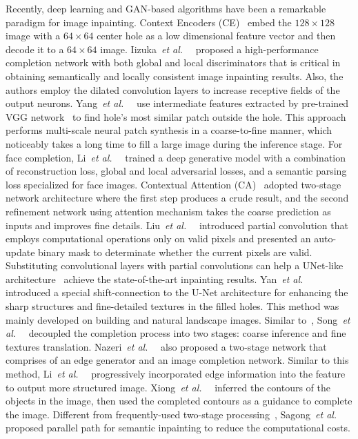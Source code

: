 \documentclass[journal]{IEEEtran}
\newcommand{\etal}{\emph{et al.}~}
\begin{document}
Recently, deep learning and GAN-based algorithms have been a remarkable paradigm for image inpainting. Context Encoders (CE)~\cite{CE} embed the $128 \times 128$ image with a $64 \times 64$ center hole as a low dimensional feature vector and then decode it to a $64 \times 64$ image. Iizuka~\etal~\cite{globally-and-locally} proposed a high-performance completion network with both global and local discriminators that is critical in obtaining semantically and locally consistent image inpainting results. Also, the authors employ the dilated convolution layers to increase receptive fields of the output neurons. Yang~\etal~\cite{high-resolution-multi-scale} use intermediate features extracted by pre-trained VGG network~\cite{VGG19} to find hole's most similar patch outside the hole. This approach performs multi-scale neural patch synthesis in a coarse-to-fine manner, which noticeably takes a long time to fill a large image during the inference stage. For face completion, Li~\etal~\cite{GFC} trained a deep generative model with a combination of reconstruction loss, global and local adversarial losses, and a semantic parsing loss specialized for face images. Contextual Attention (CA)~\cite{contextual-attention} adopted two-stage network architecture where the first step produces a crude result, and the second refinement network using attention mechanism takes the coarse prediction as inputs and improves fine details. Liu~\etal~\cite{partial-convolutions} introduced partial convolution that employs computational operations only on valid pixels and presented an auto-update binary mask to determinate whether the current pixels are valid. Substituting convolutional layers with partial convolutions can help a UNet-like architecture~\cite{img-to-img} achieve the state-of-the-art inpainting results. Yan~\etal~\cite{Shift-Net} introduced a special shift-connection to the U-Net architecture for enhancing the sharp structures and fine-detailed textures in the filled holes. This method was mainly developed on building and natural landscape images. Similar to~\cite{high-resolution-multi-scale,contextual-attention}, Song~\etal~\cite{contextual-based} decoupled the completion process into two stages: coarse inference and fine textures translation. Nazeri~\etal~\cite{EdgeConnect} also proposed a two-stage network that comprises of an edge generator and an image completion network. Similar to this method, Li~\etal~\cite{PRVS} progressively incorporated edge information into the feature to output more structured image. Xiong~\etal~\cite{Foreground} inferred the contours of the objects in the image, then used the completed contours as a guidance to complete the image. Different from frequently-used two-stage processing~\cite{StructureFlow}, Sagong~\etal~\cite{PEPSI} proposed parallel path for semantic inpainting to reduce the computational costs. 
\end{document}
